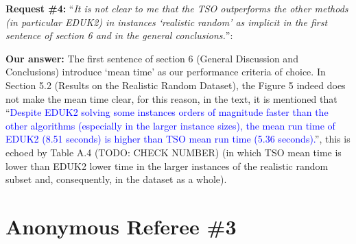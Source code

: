 \documentclass{elsarticle}
\begin{document}
\textbf{Request \#4:} ``\textit{It is not clear to me that the TSO outperforms the other methods (in particular EDUK2) in instances `realistic random' as implicit in the first sentence of section 6 and in the general conclusions.}'':

\textbf{Our answer:} The first sentence of section 6 (General Discussion and Conclusions) introduce `mean time' as our performance criteria of choice. In Section 5.2 (Results on the Realistic Random Dataset), the Figure 5 indeed does not make the mean time clear, for this reason, in the text, it is mentioned that ``\textcolor{blue}{Despite EDUK2 solving some instances orders of magnitude faster than the other algorithms (especially in the larger instance sizes), the mean run time of EDUK2 (8.51 seconds) is higher than TSO mean run time (5.36 seconds).}'', this is echoed by Table A.4 (TODO: CHECK NUMBER) (in which TSO mean time is lower than EDUK2 lower time in the larger instances of the realistic random subset and, consequently, in the dataset as a whole).
\medskip

\section{Anonymous Referee \#3}
\end{document}
